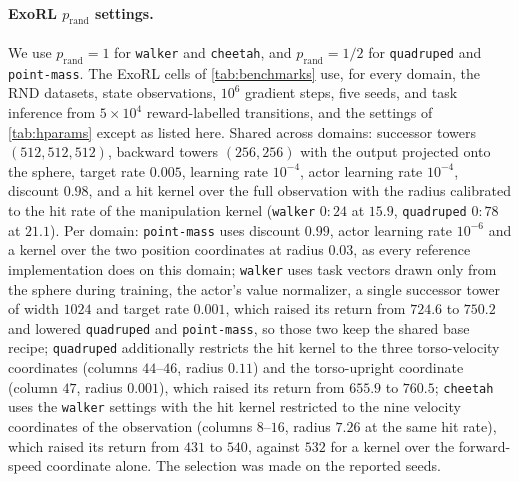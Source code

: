 \paragraph{ExoRL $p_{\mathrm{rand}}$ settings.}
\label{app:exorl-hparams}
We use $p_{\mathrm{rand}}=1$ for \texttt{walker} and \texttt{cheetah}, and $p_{\mathrm{rand}}=1/2$ for \texttt{quadruped} and \texttt{point-mass}.
The ExoRL cells of \cref{tab:benchmarks} use, for every domain, the RND datasets, state observations, $10^6$ gradient steps, five seeds, and task inference from $5\times10^4$ reward-labelled transitions, and the settings of \cref{tab:hparams} except as listed here.
Shared across domains: successor towers $(512,512,512)$, backward towers $(256,256)$ with the output projected onto the sphere, target rate $0.005$, learning rate $10^{-4}$, actor learning rate $10^{-4}$, discount $0.98$, and a hit kernel over the full observation with the radius calibrated to the hit rate of the manipulation kernel (\texttt{walker} $0:24$ at $15.9$, \texttt{quadruped} $0:78$ at $21.1$).
Per domain: \texttt{point-mass} uses discount $0.99$, actor learning rate $10^{-6}$ and a kernel over the two position coordinates at radius $0.03$, as every reference implementation does on this domain; \texttt{walker} uses task vectors drawn only from the sphere during training, the actor's value normalizer, a single successor tower of width $1024$ and target rate $0.001$, which raised its return from $724.6$ to $750.2$ and lowered \texttt{quadruped} and \texttt{point-mass}, so those two keep the shared base recipe; \texttt{quadruped} additionally restricts the hit kernel to the three torso-velocity coordinates (columns $44$--$46$, radius $0.11$) and the torso-upright coordinate (column $47$, radius $0.001$), which raised its return from $655.9$ to $760.5$; \texttt{cheetah} uses the \texttt{walker} settings with the hit kernel restricted to the nine velocity coordinates of the observation (columns $8$--$16$, radius $7.26$ at the same hit rate), which raised its return from $431$ to $540$, against $532$ for a kernel over the forward-speed coordinate alone.
The selection was made on the reported seeds.